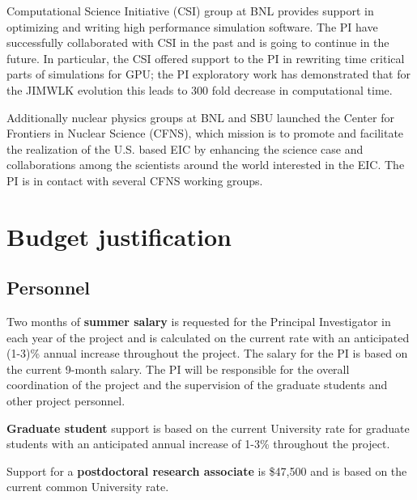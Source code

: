 \documentclass{DOEproposal}
\begin{document}
		Computational Science Initiative (CSI) group at BNL 
		provides support in optimizing and writing high performance 
		simulation software. The PI have successfully collaborated with 
		CSI in the past and is going to continue in the future. In particular, 
		the CSI offered support to the PI in rewriting time critical 
		parts of simulations for GPU; the PI exploratory 
		work has demonstrated that for the JIMWLK evolution this leads 
		to 300 fold decrease in computational time. 

		Additionally nuclear physics  groups at BNL and SBU launched 
		the Center for Frontiers in Nuclear Science (CFNS), which mission
		is to promote and facilitate the realization of the U.S. based 
		EIC by enhancing the science case and collaborations among the 
		scientists around the world interested in the EIC. The PI is in contact
		with several CFNS working groups.  

	\newpage 
\section{Budget justification}
        \label{sec:budget}
		\vspace{1.2em}			

		\subsection*{Personnel} 
		\vspace{0.5em}			

		\noindent
		Two months of {\bf summer salary} is requested for the Principal Investigator in each year of the project and
		is calculated on the current rate with an anticipated (1-3)\% annual increase throughout the project.  
		The salary for the PI is based on the current 9-month salary. 
		The PI will be responsible for the overall coordination of the project and the supervision of the graduate 
		students and other project personnel. 
	\vspace{0.5em}		

	\noindent
	{\bf Graduate student} support is based on the current University rate for graduate students with an anticipated 
		annual increase of 1-3\% throughout the project. 

	\vspace{0.5em}		

	\noindent
	Support for a {\bf postdoctoral research associate} is  \$47,500 and  is based on the current common University rate.
		\vspace{1.2em}			
\end{document}
